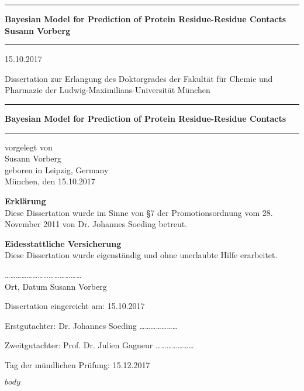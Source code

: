 \documentclass[12pt,a4paper,twoside]{book}
\newcommand{\LMUCover}[3]{
    \thispagestyle{empty}
    {\parindent0cm \rule{\linewidth}{.7ex}}
    
    \begin{flushright}
      \vspace*{\stretch{1}}
      \sffamily\bfseries\Huge
      #1\\
      \vspace*{\stretch{1}}
      \sffamily\bfseries\large
      #2
      \vspace*{\stretch{1}}
    \end{flushright}
  
    \rule{\linewidth}{.7ex}
    \vspace*{\stretch{5}}
    \vspace*{\stretch{1}}
    
    \begin{center}\sffamily\LARGE{#3}\end{center}
}
\newcommand{\LMUTitlePage}[4]{
    \thispagestyle{empty}
    \vspace*{\stretch{1}}
    
    \begin{center}
      \Large Dissertation zur Erlangung des Doktorgrades der Fakultät für Chemie und Pharmazie der Ludwig-Maximilians-Universität München
    \end{center}
    
    \vspace*{\stretch{1}}
    {\parindent0cm \rule{\linewidth}{.7ex}}
    
    \begin{flushright}
      \vspace*{\stretch{1}}
      \sffamily\bfseries\Huge
      #1\\
      \vspace*{\stretch{1}}
    \end{flushright}
  
    \rule{\linewidth}{.7ex}

    \vspace*{\stretch{3}}
    \begin{center}
      \Large vorgelegt von\\
      \Large #2\\
      \Large geboren in #3\\
      \vspace*{\stretch{2}}
      \Large München, den #4
    \end{center}
}
\newcommand{\LMUErklaerung}[5]{
    \thispagestyle{empty}
    \begin{flushleft}
      \large \textbf{Erklärung} \\[1mm]
      \large Diese Dissertation wurde im Sinne von §7 der Promotionsordnung vom 28. November 2011 von #2 betreut.
      \bigskip
  
      \large \textbf{Eidesstattliche Versicherung}\\[1mm]
      \large Diese Dissertation wurde eigenständig und ohne unerlaubte Hilfe erarbeitet.
      \vspace{5em}
  
      \dots\dots\dots   \dots\dots\dots \hfill \dots\dots\dots\dots\dots\dots\dots\dots\\
      \large Ort, Datum \hfill #1
      \vfill
  
  
      \large Dissertation eingereicht am: \hfill #4
      \bigskip
    
      \large Erstgutachter:  #2 \hfill \dots\dots\dots\dots\dots\dots\dots
      \bigskip
    
      \large Zweitgutachter: #3 \hfill \dots\dots\dots\dots\dots\dots\dots
      \bigskip
    
      \large Tag der mündlichen Prüfung: \hfill #5
    \end{flushleft}
}
\begin{document}
\frontmatter

\LMUCover
	{Bayesian Model for Prediction of Protein Residue-Residue Contacts}
	{Susann Vorberg}
	{15.10.2017}

\newpage
\thispagestyle{empty}
\cleardoublepage

\LMUTitlePage
	{Bayesian Model for Prediction of Protein Residue-Residue Contacts}
	{Susann Vorberg}
	{Leipzig, Germany}
	{15.10.2017}

\newpage
\thispagestyle{empty}
\cleardoublepage

\LMUErklaerung
	{Susann Vorberg}
	{Dr. Johannes Soeding}
	{Prof. Dr. Julien Gagneur}
	{15.10.2017}
	{15.12.2017}

\newpage
\thispagestyle{empty}
\cleardoublepage
\frontmatter\setcounter{page}{1}

$body$
\end{document}

